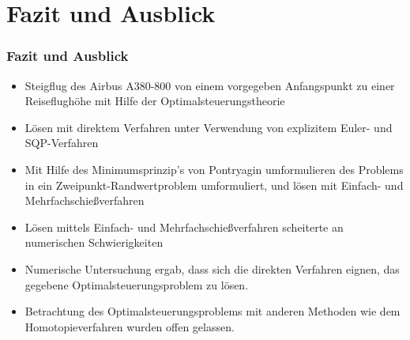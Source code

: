 \documentclass[aspectratio=169]{beamer}
\begin{document}
\section{Fazit und Ausblick}
\begin{frame}
  \frametitle{Fazit und Ausblick}
    \vspace{1em}
\small
  \begin{itemize}
    \item Steigflug des Airbus A380-800 von einem vorgegeben Anfangspunkt zu einer Reiseflughöhe mit Hilfe der Optimalsteuerungstheorie
     \item Lösen mit direktem Verfahren unter Verwendung von explizitem Euler- und SQP-Verfahren
      \item Mit Hilfe des Minimumsprinzip's von Pontryagin umformulieren des Problems in ein Zweipunkt-Randwertproblem umformuliert, und lösen mit  Einfach- und Mehrfachschießverfahren
       \item Lösen mittels Einfach- und Mehrfachschießverfahren scheiterte an numerischen Schwierigkeiten
        \item Numerische Untersuchung ergab, dass sich die direkten Verfahren eignen, das gegebene Optimalsteuerungsproblem zu lösen.  

	 \item Betrachtung des Optimalsteuerungsproblems mit anderen Methoden wie dem Homotopieverfahren wurden offen gelassen. 

  \end{itemize}
\end{frame}

\begin{frame}[plain]{}
\end{frame}
\end{document}
